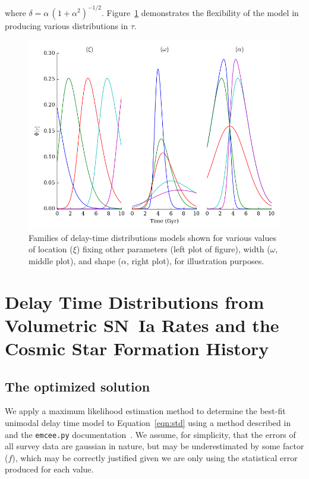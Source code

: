 \documentclass[apj]{aastex}
\begin{document}
where $\delta=\alpha\,(1+\alpha^2)^{-1/2}$. Figure~\ref{fig:dtd_families} demonstrates the flexibility of the model in producing various distributions in $\tau$. 

\begin{figure}[t]
   \centering
   \includegraphics[width=6.5in]{figure_dtd_families}
   \caption{\footnotesize Families of delay-time distributions models shown for various values of location ($\xi$) fixing other parameters (left plot of figure), width ($\omega$, middle plot), and shape ($\alpha$, right plot), for illustration purposes.}
   \label{fig:dtd_families}
\end{figure}

\section{Delay Time Distributions from Volumetric SN~Ia Rates and the Cosmic Star Formation History}

\subsection{The optimized solution\label{sec:optimized_soln}}
We apply a maximum likelihood estimation method to determine the best-fit unimodal delay time model to Equation~\ref{eqn:std} using a method described in \cite{Hogg:2010fj} and the {\tt emcee.py} documentation~\citep{Foreman-Mackey:2013pd}. We assume, for simplicity, that the errors of all survey data are gaussian in nature, but may be underestimated by some factor ($f$), which may be correctly justified given we are only using the statistical error produced for each value. 
\end{document}
